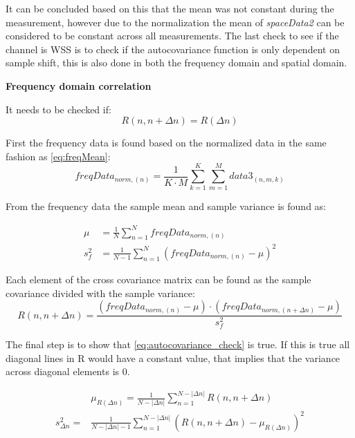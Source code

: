 It can be concluded based on this that the mean was not constant during the measurement, however due to the normalization the mean of \textit{spaceData2} can be considered to be constant across all measurements. The last check to see if the channel is \gls{WSS} is to check if the autocovariance function is only dependent on sample shift, this is also done in both the frequency domain and spatial domain.

\textbf{Frequency domain correlation}

It needs to be checked if:
\begin{equation}\label{eq:autocovariance_check}
R(n,n+\Delta n) = R(\Delta n) 
\end{equation}

First the frequency data is found based on the normalized data in the same fashion as \autoref{eq:freqMean}:
\begin{equation}
freqData_{norm, (n)} = \frac{1}{K\cdot M}\sum_{k = 1}^{K}\sum_{m = 1}^{M} data3_{(n,m,k)}
\end{equation}

From the frequency data the sample mean and sample variance is found as:

\begin{align}
\mu &= \frac{1}{N}\sum_{n = 1}^{N} freqData_{norm, (n)} \\
s_f^2 &= \frac{1}{N-1}\sum_{n = 1}^{N} \left( freqData_{norm, (n)} - \mu \right)^2
\end{align}

Each element of the cross covariance matrix can be found as the sample covariance divided with the sample variance:
\begin{equation}
R(n,n+\Delta n) = \frac{\left(freqData_{norm, (n)}-\mu\right)\cdot \left(freqData_{norm, (n+\Delta n)}-\mu\right)}{s_f^2}
\end{equation}


The final step is to show that \autoref{eq:autocovariance_check} is true. If this is true all diagonal lines in R would have a constant value, that implies that the variance across diagonal elements is 0. 

\begin{align}
&\mu_{R(\Delta n)} = \frac{1}{N-|\Delta n|}\sum_{n = 1}^{N-|\Delta n|} R(n,n+\Delta n) \\
s_{\Delta n}^2 = &\frac{1}{N-|\Delta n|-1}\sum_{n = 1}^{N-|\Delta n|} \left( R(n,n+\Delta n) - \mu_{R(\Delta n)} \right)^2 \label{eq:variance_of_covariance}
\end{align}

